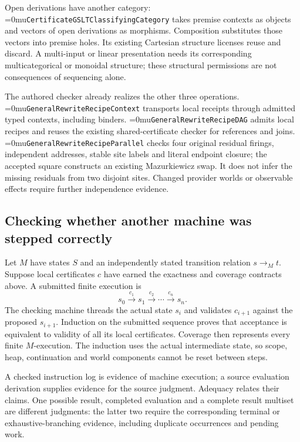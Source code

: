 \documentclass[11pt,a4paper]{article}
\newcommand{\name}[1]{\textup{\Urlmuskip=0mu\relax\nolinkurl{#1}}}
\begin{document}
Open derivations have another category:
\name{CertificateGSLTClassifyingCategory} takes premise contexts as objects
and vectors of open derivations as morphisms. Composition substitutes those
vectors into premise holes. Its existing Cartesian structure licenses reuse
and discard. A multi-input or linear presentation needs its corresponding
multicategorical or monoidal structure; these structural permissions are not
consequences of sequencing alone.

The authored checker already realizes the other three operations.
\name{GeneralRewriteRecipeContext} transports local receipts through admitted
typed contexts, including binders.
\name{GeneralRewriteRecipeDAG} admits local recipes and reuses the existing
shared-certificate checker for references and joins.
\name{GeneralRewriteRecipeParallel} checks four original residual firings,
independent addresses, stable site labels and literal endpoint closure; the
accepted square constructs an existing Mazurkiewicz swap. It does not infer
the missing residuals from two disjoint sites. Changed provider worlds or
observable effects require further independence evidence.

\newpage
\subsection{Checking whether another machine was stepped correctly}

Let $M$ have states $S$ and an independently stated transition relation
$s\mathrel{\longrightarrow_M}t$. Suppose local certificates $c$ have earned
the exactness and coverage contracts above. A submitted finite execution is
\[
 s_0\xrightarrow{c_1}s_1\xrightarrow{c_2}\cdots
       \xrightarrow{c_n}s_n.
\]
The checking machine threads the actual state $s_i$ and validates $c_{i+1}$
against the proposed $s_{i+1}$. Induction on the submitted sequence proves
that acceptance is equivalent to validity of all its local certificates.
Coverage then represents every finite $M$-execution. The induction uses the
actual intermediate state, so scope, heap, continuation and world components
cannot be reset between steps.

A checked instruction log is evidence of machine execution; a source evaluation
derivation supplies evidence for the source judgment. Adequacy relates their
claims. One possible result, completed evaluation and a complete result multiset
are different judgments: the latter two require the corresponding terminal or
exhaustive-branching evidence, including duplicate occurrences and pending work.
\end{document}
